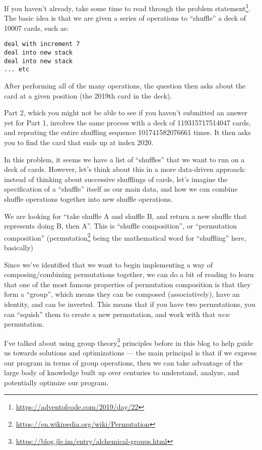 \documentclass[]{article}
\renewcommand{\href}[2]{#2\footnote{\url{#1}}}
\begin{document}
If you haven't already, take some time to
\href{https://adventofcode.com/2019/day/22}{read through the problem statement}.
The basic idea is that we are given a series of operations to ``shuffle'' a deck
of 10007 cards, such as:

\begin{verbatim}
deal with increment 7
deal into new stack
deal into new stack
... etc
\end{verbatim}

After performing all of the many operations, the question then asks about the
card at a given position (the 2019th card in the deck).

Part 2, which you might not be able to see if you haven't submitted an answer
yet for Part 1, involves the same process with a deck of 119315717514047 cards,
and repeating the entire shuffling sequence 101741582076661 times. It then asks
you to find the card that ends up at index 2020.

In this problem, it seems we have a list of ``shuffles'' that we want to run on
a deck of cards. However, let's think about this in a more data-driven approach:
instead of thinking about successive shufflings of cards, let's imagine the
specification of a ``shuffle'' itself as our main data, and how we can combine
shuffle operations together into new shuffle operations.

We are looking for ``take shuffle A and shuffle B, and return a new shuffle that
represents doing B, then A''. This is ``shuffle composition'', or ``permutation
composition'' (\href{https://en.wikipedia.org/wiki/Permutation}{permutation}
being the mathematical word for ``shuffling'' here, basically)

Since we've identified that we want to begin implementing a way of
composing/combining permutations together, we can do a bit of reading to learn
that one of the most famous properties of permutation composition is that they
form a ``group'', which means they can be composed (associatively), have an
identity, and can be inverted. This means that if you have two permutations, you
can ``squish'' them to create a new permutation, and work with that \emph{new}
permutation.

I've talked about \href{https://blog.jle.im/entry/alchemical-groups.html}{using
group theory} principles before in this blog to help guide us towards solutions
and optimizations --- the main principal is that if we express our program in
terms of group operations, then we can take advantage of the large body of
knowledge built up over centuries to understand, analyze, and potentially
optimize our program.
\end{document}

